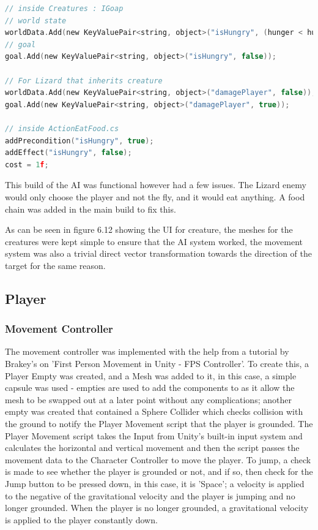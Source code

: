 \documentclass[11pt]{report}
\begin{document}
\begin{lstlisting}[language=c]
// inside Creatures : IGoap 
// world state
worldData.Add(new KeyValuePair<string, object>("isHungry", (hunger < hungerThreshold)));
// goal
goal.Add(new KeyValuePair<string, object>("isHungry", false));

// For Lizard that inherits creature
worldData.Add(new KeyValuePair<string, object>("damagePlayer", false)); 
goal.Add(new KeyValuePair<string, object>("damagePlayer", true));
 
// inside ActionEatFood.cs
addPrecondition("isHungry", true);
addEffect("isHungry", false);
cost = 1f;
\end{lstlisting}

This build of the AI was functional however had a few issues. The Lizard enemy would only choose the player and not the fly, and it would eat anything. A food chain was added in the main build to fix this.

As can be seen in figure 6.12 showing the UI for creature, the meshes for the creatures were kept simple to ensure that the AI system worked, the movement system was also a trivial direct vector transformation towards the direction of the target for the same reason.



\subsection{Player}
\subsubsection{Movement Controller}
The movement controller was implemented with the help from a tutorial by Brakey's on 'First Person Movement in Unity - FPS Controller'\cite{fpsController}. To create this, a Player Empty was created, and a Mesh was added to it, in this case, a simple capsule was used - empties are used to add the components to as it allow the mesh to be swapped out at a later point without any complications; another empty was created that contained a Sphere Collider which checks collision with the ground to notify the Player Movement script that the player is grounded. The Player Movement script takes the Input from Unity's built-in input system and calculates the horizontal and vertical movement and then the script passes the movement data to the Character Controller to move the player. To jump, a check is made to see whether the player is grounded or not, and if so, then check for the Jump button to be pressed down, in this case, it is 'Space'; a velocity is applied to the negative of the gravitational velocity and the player is jumping and no longer grounded. When the player is no longer grounded, a gravitational velocity is applied to the player constantly down.
\end{document}

